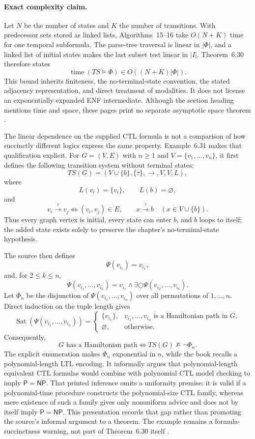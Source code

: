 \paragraph{Exact complexity claim.}
Let \(N\) be the number of states and \(K\) the number of transitions.  With
predecessor sets stored as linked lists, Algorithms~15--16 take
\(O(N+K)\) time for one temporal subformula.  The parse-tree traversal is
linear in \(\lvert\Phi\rvert\), and a linked list of initial states makes the
last subset test linear in \(\lvert I\rvert\).  Theorem~6.30 therefore states
\[
 \operatorname{time}(TS\models\Phi)
   \in O((N+K)\lvert\Phi\rvert).
\]
This bound inherits finiteness, the no-terminal-state convention, the stated
adjacency representation, and direct treatment of modalities.  It does not
license an exponentially expanded ENF intermediate.  Although the section
heading mentions time and space, these pages print no separate asymptotic
space theorem \cite[p.~355]{BaierKatoen2008}.

The linear dependence on the supplied CTL formula is not a comparison of how
succinctly different logics express the same property.  Example~6.31 makes
that qualification explicit.  For \(G=(V,E)\) with \(n\geq1\) and
\(V=\{v_1,\ldots,v_n\}\), it first defines the following transition system
without terminal states:
\[
 TS(G)=(V\cup\{b\},\{\tau\},{\to},V,V,L),
\]
where
\[
 L(v_i)=\{v_i\},\qquad L(b)=\varnothing,
\]
and
\[
 v_i\xrightarrow{\tau}v_j\iff(v_i,v_j)\in E,
 \qquad
 x\xrightarrow{\tau}b\quad(x\in V\cup\{b\}).
\]
Thus every graph vertex is initial, every state can enter \(b\), and \(b\)
loops to itself; the added state exists solely to preserve the chapter's
no-terminal-state hypothesis.

The source then defines
\[
 \Psi(v_{i_1})=v_{i_1},
\]
and, for \(2\le k\le n\),
\[
 \Psi(v_{i_1},\ldots,v_{i_k})
   =v_{i_1}\land\exists\bigcirc
       \Psi(v_{i_2},\ldots,v_{i_k}).
\]
Let \(\Phi_n\) be the disjunction of
\(\Psi(v_{i_1},\ldots,v_{i_n})\) over all permutations of
\(1,\ldots,n\).  Direct induction on the tuple length gives
\[
 \operatorname{Sat}(\Psi(v_{i_1},\ldots,v_{i_n}))
 =
 \begin{cases}
  \{v_{i_1}\},&
    v_{i_1},\ldots,v_{i_n}\text{ is a Hamiltonian path in }G,\\
  \varnothing,&\text{otherwise}.
 \end{cases}
\]
Consequently,
\[
 G\text{ has a Hamiltonian path}
 \iff TS(G)\not\models\neg\Phi_n.
\]
The explicit enumeration makes \(\Phi_n\) exponential in \(n\), while the
book recalls a polynomial-length LTL encoding.  It informally argues that
polynomial-length equivalent CTL formulas would combine with polynomial CTL
model checking to imply \(\mathsf P=\mathsf{NP}\).  That printed inference
omits a uniformity premise: it is valid if a polynomial-time procedure
constructs the polynomial-size CTL family, whereas mere existence of such a
family gives only nonuniform advice and does not by itself imply
\(\mathsf P=\mathsf{NP}\).  This presentation records that gap rather than
promoting the source's informal argument to a theorem.  The example remains a
formula-succinctness warning, not part of Theorem~6.30 itself
\cite[ex.~6.31; pp.~355--358]{BaierKatoen2008}.

